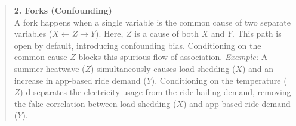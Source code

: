 \begin{quote}
\textbf{2. Forks (Confounding)}\\
A fork happens when a single variable is the common cause of two separate variables ($X \leftarrow Z \rightarrow Y$). Here, $Z$ is a cause of both $X$ and $Y$.
This path is open by default, introducing confounding bias. Conditioning on the common cause $Z$ blocks this spurious flow of association.
\textit{Example:} A summer heatwave ($Z$) simultaneously causes load-shedding ($X$) and an increase in app-based ride demand ($Y$). Conditioning on the temperature ($Z$) d-separates the electricity usage from the ride-hailing demand, removing the fake correlation between load-shedding ($X$) and app-based ride demand ($Y$).

\begin{center}
\end{center}
\end{quote}

